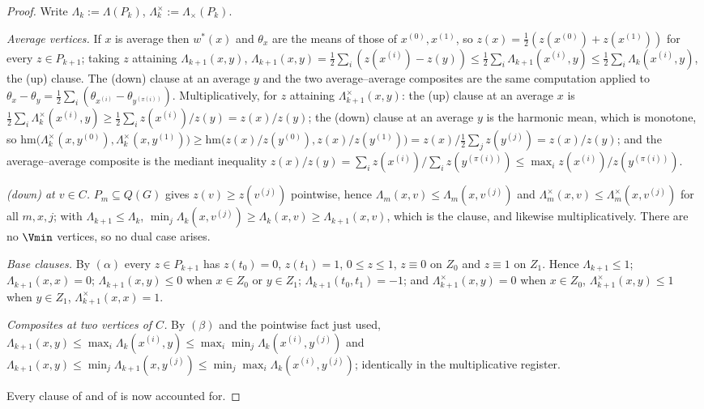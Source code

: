 \begin{proof}
Write $\Lambda_k:=\Lambda(P_k)$, $\Lambda^{\times}_k:=\Lambda_\times(P_k)$.

\emph{Average vertices.} If $x$ is average then $w^\ast(x)$ and
$\theta_x$ are the means of those of $x^{(0)},x^{(1)}$, so
$z(x)=\tfrac12(z(x^{(0)})+z(x^{(1)}))$ for every $z\in P_{k+1}$; taking
$z$ attaining $\Lambda_{k+1}(x,y)$,
$\Lambda_{k+1}(x,y)=\tfrac12\sum_i(z(x^{(i)})-z(y))
\le\tfrac12\sum_i\Lambda_{k+1}(x^{(i)},y)\le\tfrac12\sum_i\Lambda_k(x^{(i)},y)$,
the (up) clause. The (down) clause at an average $y$ and the two
average--average composites are the same computation applied to
$\theta_x-\theta_y=\tfrac12\sum_i(\theta_{x^{(i)}}-\theta_{y^{(\pi(i))}})$.
Multiplicatively, for $z$ attaining $\Lambda^\times_{k+1}(x,y)$: the (up)
clause at an average $x$ is
$\tfrac12\sum_i\Lambda^\times_k(x^{(i)},y)\ge
\tfrac12\sum_iz(x^{(i)})/z(y)=z(x)/z(y)$; the (down) clause at an average
$y$ is the harmonic mean, which is monotone, so
$\mathrm{hm}\bigl(\Lambda^\times_k(x,y^{(0)}),\Lambda^\times_k(x,y^{(1)})\bigr)
\ge\mathrm{hm}\bigl(z(x)/z(y^{(0)}),z(x)/z(y^{(1)})\bigr)
=z(x)\big/\tfrac12\textstyle\sum_jz(y^{(j)})=z(x)/z(y)$; and the
average--average composite is the mediant inequality
$z(x)/z(y)=\sum_iz(x^{(i)})\big/\sum_iz(y^{(\pi(i))})
\le\max_iz(x^{(i)})/z(y^{(\pi(i))})$.

\emph{(down) at $v\in C$.} $P_m\subseteq Q(G)$ gives $z(v)\ge z(v^{(j)})$
pointwise, hence $\Lambda_m(x,v)\le\Lambda_m(x,v^{(j)})$ and
$\Lambda^\times_m(x,v)\le\Lambda^\times_m(x,v^{(j)})$ for all $m,x,j$;
with $\Lambda_{k+1}\le\Lambda_k$,
$\min_j\Lambda_k(x,v^{(j)})\ge\Lambda_k(x,v)\ge\Lambda_{k+1}(x,v)$, which
is the clause, and likewise multiplicatively. There are no $\Vmin$
vertices, so no dual case arises.

\emph{Base clauses.} By $(\alpha)$ every $z\in P_{k+1}$ has $z(t_0)=0$,
$z(t_1)=1$, $0\le z\le1$, $z\equiv0$ on $Z_0$ and $z\equiv1$ on $Z_1$.
Hence $\Lambda_{k+1}\le1$; $\Lambda_{k+1}(x,x)=0$;
$\Lambda_{k+1}(x,y)\le0$ when $x\in Z_0$ or $y\in Z_1$;
$\Lambda_{k+1}(t_0,t_1)=-1$; and $\Lambda^\times_{k+1}(x,y)=0$ when
$x\in Z_0$, $\Lambda^\times_{k+1}(x,y)\le1$ when $y\in Z_1$,
$\Lambda^\times_{k+1}(x,x)=1$.

\emph{Composites at two vertices of $C$.} By $(\beta)$ and the pointwise
fact just used,
$\Lambda_{k+1}(x,y)\le\max_i\Lambda_k(x^{(i)},y)
\le\max_i\min_j\Lambda_k(x^{(i)},y^{(j)})$ and
$\Lambda_{k+1}(x,y)\le\min_j\Lambda_{k+1}(x,y^{(j)})
\le\min_j\max_i\Lambda_k(x^{(i)},y^{(j)})$; identically in the
multiplicative register.

Every clause of  and of  is now
accounted for.
\end{proof}


